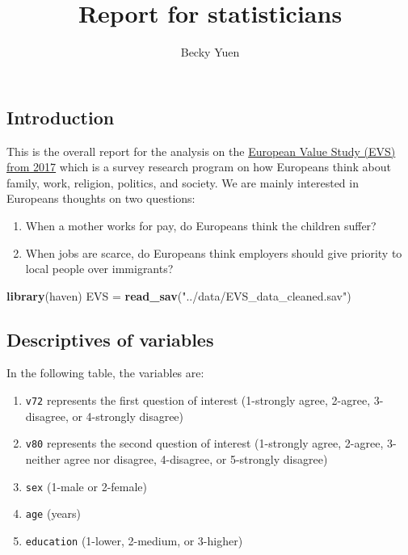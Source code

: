 \documentclass[
]{article}
\title{Report for statisticians}
\author{Becky Yuen}
\date{}
\newenvironment{Shaded}{\begin{snugshade}}{\end{snugshade}}
\newcommand{\FunctionTok}[1]{\textcolor[rgb]{0.13,0.29,0.53}{\textbf{#1}}}
\newcommand{\NormalTok}[1]{#1}
\newcommand{\OtherTok}[1]{\textcolor[rgb]{0.56,0.35,0.01}{#1}}
\newcommand{\StringTok}[1]{\textcolor[rgb]{0.31,0.60,0.02}{#1}}
\providecommand{\tightlist}{%
  \setlength{\itemsep}{0pt}\setlength{\parskip}{0pt}}
\begin{document}
\maketitle

\hypertarget{introduction}{%
\subsection{Introduction}\label{introduction}}

This is the overall report for the analysis on the
\href{https://search.gesis.org/research_data/ZA7500}{European Value
Study (EVS) from 2017} which is a survey research program on how
Europeans think about family, work, religion, politics, and society. We
are mainly interested in Europeans thoughts on two questions:

\begin{enumerate}
\def\labelenumi{\arabic{enumi}.}
\tightlist
\item
  When a mother works for pay, do Europeans think the children suffer?
\item
  When jobs are scarce, do Europeans think employers should give
  priority to local people over immigrants?
\end{enumerate}

\begin{Shaded}
\begin{Highlighting}[]
\FunctionTok{library}\NormalTok{(haven)}
\NormalTok{EVS }\OtherTok{=} \FunctionTok{read\_sav}\NormalTok{(}\StringTok{"../data/EVS\_data\_cleaned.sav"}\NormalTok{)}
\end{Highlighting}
\end{Shaded}

\hypertarget{descriptives-of-variables}{%
\subsection{Descriptives of variables}\label{descriptives-of-variables}}

In the following table, the variables are:

\begin{enumerate}
\def\labelenumi{\arabic{enumi}.}
\tightlist
\item
  \texttt{v72} represents the first question of interest (1-strongly
  agree, 2-agree, 3-disagree, or 4-strongly disagree)
\item
  \texttt{v80} represents the second question of interest (1-strongly
  agree, 2-agree, 3-neither agree nor disagree, 4-disagree, or
  5-strongly disagree)
\item
  \texttt{sex} (1-male or 2-female)
\item
  \texttt{age} (years)
\item
  \texttt{education} (1-lower, 2-medium, or 3-higher)
\end{enumerate}
\end{document}
